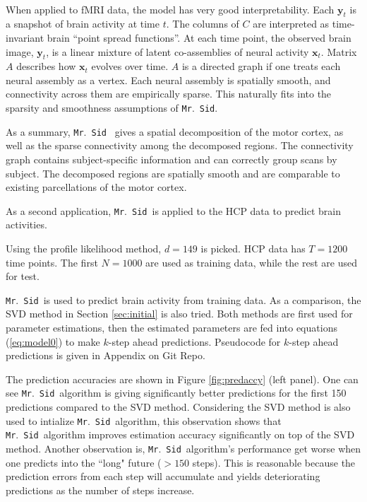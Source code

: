 \documentclass[fleqn,12pt]{article}
\let\oldref\ref
\renewcommand{\ref}[1]{(\oldref{#1})}
\newcommand{\mrsid}{{\sc \texttt{Mr}.~\texttt{Sid}}}
\providecommand{\mb}[1]{\boldsymbol{#1}}
\newcommand{\bx}{\mb{x}}
\newcommand{\by}{\mb{y}}
\begin{document}
\begin{center}
\[\begin{array}{lll}
\end{array}
\]
\label{fig:3d}
\end{center}

When applied to fMRI data, the model has very good interpretability. Each $\by_t$ is a snapshot of brain activity at time $t$. The columns of $C$ are interpreted as time-invariant brain ``point spread functions''. At each time point, the observed brain image, $\by_t$, is a linear mixture of latent co-assemblies of neural activity  $\bx_t$. Matrix $A$ describes how $\bx_t$ evolves over time. $A$ is a directed graph if one treats each neural assembly as a vertex. Each neural assembly is spatially smooth, and connectivity across them are empirically sparse. This naturally fits into the sparsity and smoothness assumptions of \mrsid.

As a summary, \mrsid~ gives a spatial decomposition of the motor cortex, as well as the sparse connectivity among the decomposed regions. The connectivity graph contains subject-specific information and can correctly group scans by subject. The decomposed regions are spatially smooth and are comparable to existing parcellations of the motor cortex.

As a second application, \mrsid~is applied to the HCP data to predict brain activities.

Using the profile likelihood method, $d=149$ is picked. HCP data has $T=1200$ time points. The first $N = 1000$ are used as training data, while the rest are used for test.

\mrsid~is used to predict brain activity from training data. As a comparison, the SVD method in Section \oldref{sec:initial} is also tried. Both methods are first used for parameter estimations, then the estimated parameters are fed into equations \ref{eq:model0} to make $k$-step ahead predictions. Pseudocode for $k$-step ahead predictions is given in Appendix on Git Repo.

The prediction accuracies are shown in Figure \oldref{fig:predaccy} (left panel). One can see \mrsid~algorithm is giving significantly better predictions for the first 150 predictions compared to the SVD method. Considering the SVD method is also used to intialize \mrsid~algorithm, this observation shows that \mrsid~algorithm improves estimation accuracy significantly on top of the SVD method. Another observation is, \mrsid~algorithm's performance get worse when one predicts into the ``long" future ($>150$ steps). This is reasonable because the prediction errors from each step will accumulate and yields deteriorating predictions as the number of steps increase.
\end{document}
